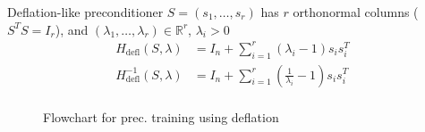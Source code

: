 \documentclass[10pt,aspectratio=169]{beamer}
\begin{document}
\begin{frame}{Deflation-like preconditioner}
$S =(s_1,\dots,s_r)$ has $r$ orthonormal columns ($S^TS = I_r$), 
and $(\lambda_1,\dots, \lambda_r) \in \mathbb{R}^{r}$, $\lambda_i > 0$
    \begin{align}
        H_{\text{defl}}(S, \lambda) &= I_n + \sum_{i=1}^r (\lambda_i- 1)s_is_i^T\\
        H^{-1}_{\text{defl}}(S, \lambda) &= I_n + \sum_{i=1}^r \left(\frac{1}{\lambda_i}- 1\right)s_is_i^T\\        
    \end{align}

    \begin{figure}
    \centering
    \resizebox{0.5\textwidth}{!}{    
    }
    \caption{Flowchart for prec. training using deflation}
    \label{fig:archi_nn_defl}
\end{figure}
\end{frame}
\end{document}
